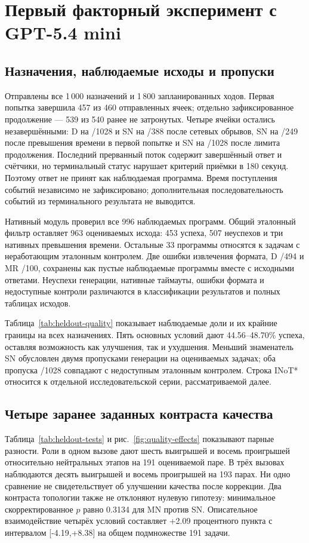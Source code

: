 \section{Первый факторный эксперимент с GPT-5.4 mini}
\label{sec:primary-results}
\subsection{Назначения, наблюдаемые исходы и пропуски}
Отправлены все 1\,000 назначений и 1\,800 запланированных ходов. Первая попытка завершила 457 из 460 отправленных ячеек; отдельно зафиксированное продолжение --- 539 из 540 ранее не затронутых. Четыре ячейки остались незавершёнными: D на /1028 и SN на /388 после сетевых обрывов, SN на /249 после превышения времени в первой попытке и SN на /1028 после лимита продолжения. Последний прерванный поток содержит завершённый ответ и счётчики, но терминальный статус нарушает критерий приёмки в 180 секунд. Поэтому ответ не принят как наблюдаемая программа. Время поступления событий независимо не зафиксировано; дополнительная последовательность событий из терминального результата не выводится.

Нативный модуль проверил все 996 наблюдаемых программ. Общий эталонный фильтр оставляет 963 оцениваемых исхода: 453 успеха, 507 неуспехов и три нативных превышения времени. Остальные 33 программы относятся к задачам с неработающим эталонным контролем. Две ошибки извлечения формата, D /494 и MR /100, сохранены как пустые наблюдаемые программы вместе с исходными ответами. Неуспехи генерации, нативные таймауты, ошибки формата и недоступные контроли различаются в классификации результатов и полных таблицах исходов.

Таблица~\ref{tab:heldout-quality} показывает наблюдаемые доли и их крайние границы на всех назначениях. Пять основных условий дают 44.56--48.70\% успеха, оставляя возможность как улучшения, так и ухудшения. Меньший знаменатель SN обусловлен двумя пропусками генерации на оцениваемых задачах; оба пропуска /1028 совпадают с недоступным эталонным контролем. Строка INoT* относится к отдельной исследовательской серии, рассматриваемой далее.


\subsection{Четыре заранее заданных контраста качества}
Таблица~\ref{tab:heldout-tests} и рис.~\ref{fig:quality-effects} показывают парные разности. Роли в одном вызове дают шесть выигрышей и восемь проигрышей относительно нейтральных этапов на 191 оцениваемой паре. В трёх вызовах наблюдаются десять выигрышей и восемь проигрышей на 193 парах. Ни одно сравнение не свидетельствует об улучшении качества после коррекции. Два контраста топологии также не отклоняют нулевую гипотезу: минимальное скорректированное $p$ равно 0.3134 для MN против SN. Описательное взаимодействие четырёх условий составляет +2.09 процентного пункта с интервалом [-4.19,+8.38] на общем подмножестве 191 задачи.

